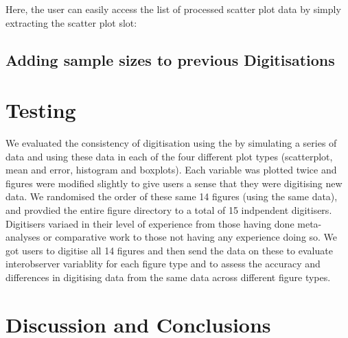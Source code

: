 \documentclass[article]{jss}
\begin{document}
Here, the user can easily access the list of processed scatter plot data by simply extracting the scatter plot slot:

\begin{CodeChunk}
\end{CodeChunk}

\subsection{Adding sample sizes to previous Digitisations}

\section{Testing}

We evaluated the consistency of digitisation using the  by simulating a series of data and using these data in each of the four different plot types (scatterplot, mean and error, histogram and boxplots). Each variable was plotted twice and figures were modified slightly to give users a sense that they were digitising new data. We randomised the order of these same 14 figures (using the same data), and provdied the entire figure directory to a total of 15 indpendent digitisers. Digitisers variaed in their level of experience from those having done meta-analyses or comparative work to those not having any experience doing so. We got users to digitise all 14 figures and then send the data on these to evaluate interobserver variablity for each figure type and to assess the accuracy and differences in digitising data from the same data across different figure types.  


\section{Discussion and Conclusions}

\end{document}
